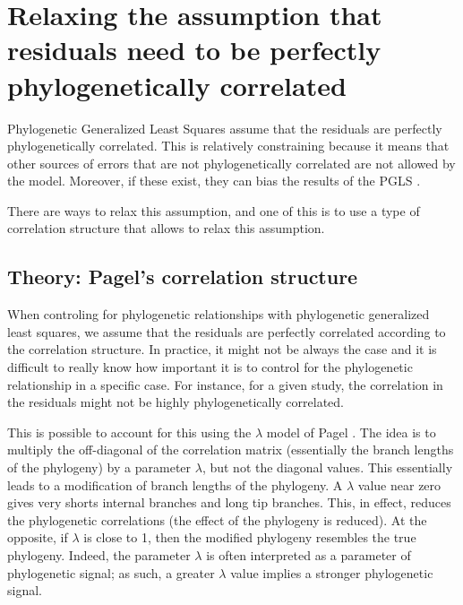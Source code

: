 \documentclass[
]{book}
\begin{document}
\hypertarget{relaxing-the-assumption-that-residuals-need-to-be-perfectly-phylogenetically-correlated}{%
\chapter{Relaxing the assumption that residuals need to be perfectly phylogenetically correlated}\label{relaxing-the-assumption-that-residuals-need-to-be-perfectly-phylogenetically-correlated}}

Phylogenetic Generalized Least Squares assume that the residuals are perfectly phylogenetically correlated. This is relatively constraining because it means that other sources of errors that are not phylogenetically correlated are not allowed by the model. Moreover, if these exist, they can bias the results of the PGLS \citep{revell2010phylogenetic}.

There are ways to relax this assumption, and one of this is to use a type of correlation structure that allows to relax this assumption.

\hypertarget{theory-pagels-correlation-structure}{%
\section{Theory: Pagel's correlation structure}\label{theory-pagels-correlation-structure}}

When controling for phylogenetic relationships with phylogenetic generalized least squares, we assume that the residuals are perfectly correlated according to the correlation structure. In practice, it might not be always the case and it is difficult to really know how important it is to control for the phylogenetic relationship in a specific case. For instance, for a given study, the correlation in the residuals might not be highly phylogenetically correlated.

This is possible to account for this using the \(\lambda\) model of Pagel \citep{pagel1999inferring}. The idea is to multiply the off-diagonal of the correlation matrix (essentially the branch lengths of the phylogeny) by a parameter \(\lambda\), but not the diagonal values. This essentially leads to a modification of branch lengths of the phylogeny. A \(\lambda\) value near zero gives very shorts internal branches and long tip branches. This, in effect, reduces the phylogenetic correlations (the effect of the phylogeny is reduced). At the opposite, if \(\lambda\) is close to 1, then the modified phylogeny resembles the true phylogeny. Indeed, the parameter \(\lambda\) is often interpreted as a parameter of phylogenetic signal; as such, a greater \(\lambda\) value implies a stronger phylogenetic signal.
\end{document}
